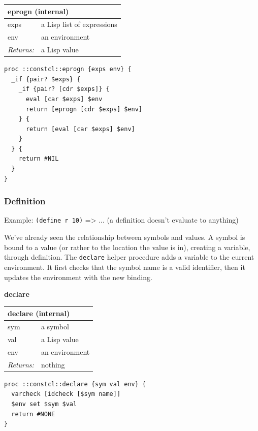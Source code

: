 \documentclass[twoside,9pt]{report}
\begin{document}
\begin{tabular}{ |l l| }
\hline
\multicolumn{2}{|l|}{eprogn (internal)} \\
\hline
exps & a Lisp list of expressions \\
env & an environment \\
\textit{Returns:} & a Lisp value \\
\hline
\end{tabular}

\noindent\makebox[\linewidth]{\rule{\linewidth}{0.4pt}}
\begin{lstlisting}
proc ::constcl::eprogn {exps env} {
  _if {pair? $exps} {
    _if {pair? [cdr $exps]} {
      eval [car $exps] $env
      return [eprogn [cdr $exps] $env]
    } {
      return [eval [car $exps] $env]
    }
  } {
    return #NIL
  }
}
\end{lstlisting}
\noindent\makebox[\linewidth]{\rule{\linewidth}{0.4pt}}
\subsubsection{Definition}
\label{definition}

Example: \texttt{(define r 10)} => ... (a definition doesn't evaluate to anything)


We've already seen the relationship between symbols and values. A symbol is bound to a value (or rather to the location the value is in), creating a variable, through definition. The \texttt{declare} helper procedure adds a variable to the current environment. It first checks that the symbol name is a valid identifier, then it updates the environment with the new binding.


\textbf{declare}

\begin{tabular}{ |l l| }
\hline
\multicolumn{2}{|l|}{declare (internal)} \\
\hline
sym & a symbol \\
val & a Lisp value \\
env & an environment \\
\textit{Returns:} & nothing \\
\hline
\end{tabular}

\noindent\makebox[\linewidth]{\rule{\linewidth}{0.4pt}}
\begin{lstlisting}
proc ::constcl::declare {sym val env} {
  varcheck [idcheck [$sym name]]
  $env set $sym $val
  return #NONE
}
\end{lstlisting}
\noindent\makebox[\linewidth]{\rule{\linewidth}{0.4pt}}
\end{document}
